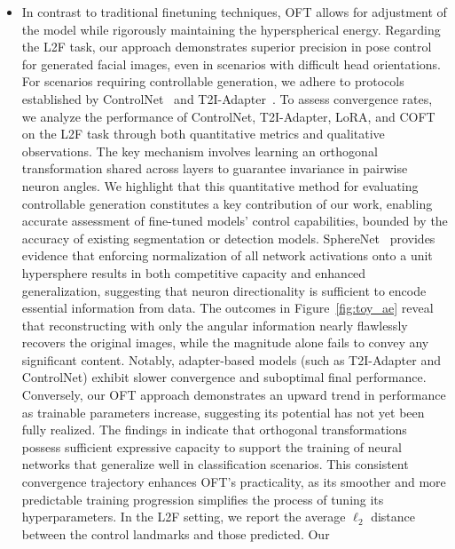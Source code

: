 \begin{itemize}[leftmargin=*,nosep]
A further restriction of OFT's flexibility can be imposed by confining the finetuned model to lie within a constrained vicinity of the pretrained solution. Notably, LoRA requires 20 epochs to match the accuracy OFT attains by epoch 8. As our quantitative measure, we calculate the mean $\ell_2$ distance between the control face landmarks and those predicted by each model. Though the use of block diagonal parametrization partially mitigates this issue, discovering methods to efficiently perform matrix inversion in a differentiable fashion is still unresolved. Instance-specific image variation is enabled in \cite{casanova2021instance}, albeit sometimes at the cost of losing instance-defining nuances. Despite these reductions, the resulting transformation $\bm{R}$ retains its orthogonal nature, ensuring the preservation of hyperspherical energy properties. \item In contrast to traditional finetuning techniques, OFT allows for adjustment of the model while rigorously maintaining the hyperspherical energy. Regarding the L2F task, our approach demonstrates superior precision in pose control for generated facial images, even in scenarios with difficult head orientations. For scenarios requiring controllable generation, we adhere to protocols established by ControlNet~\cite{zhang2023adding} and T2I-Adapter~\cite{mou2023t2i}. To assess convergence rates, we analyze the performance of ControlNet, T2I-Adapter, LoRA, and COFT on the L2F task through both quantitative metrics and qualitative observations. The key mechanism involves learning an orthogonal transformation shared across layers to guarantee invariance in pairwise neuron angles. We highlight that this quantitative method for evaluating controllable generation constitutes a key contribution of our work, enabling accurate assessment of fine-tuned models’ control capabilities, bounded by the accuracy of existing segmentation or detection models. SphereNet~\cite{liu2017deep} provides evidence that enforcing normalization of all network activations onto a unit hypersphere results in both competitive capacity and enhanced generalization, suggesting that neuron directionality is sufficient to encode essential information from data. The outcomes in Figure~\ref{fig:toy_ae} reveal that reconstructing with only the angular information nearly flawlessly recovers the original images, while the magnitude alone fails to convey any significant content. Notably, adapter-based models (such as T2I-Adapter and ControlNet) exhibit slower convergence and suboptimal final performance. Conversely, our OFT approach demonstrates an upward trend in performance as trainable parameters increase, suggesting its potential has not yet been fully realized. The findings in \cite{liu2021orthogonal} indicate that orthogonal transformations possess sufficient expressive capacity to support the training of neural networks that generalize well in classification scenarios. This consistent convergence trajectory enhances OFT’s practicality, as its smoother and more predictable training progression simplifies the process of tuning its hyperparameters. In the L2F setting, we report the average $\ell_2$ distance between the control landmarks and those predicted. Our 
\end{itemize}
